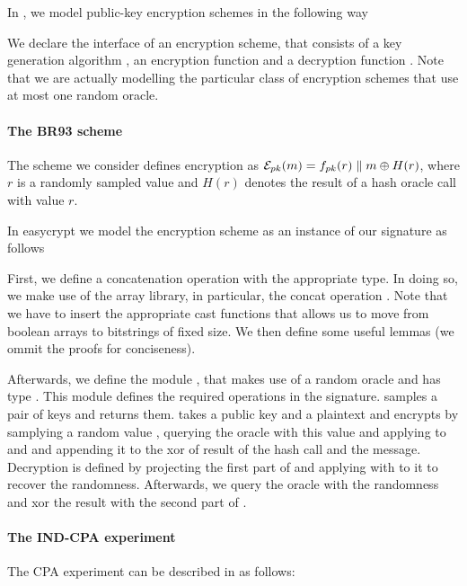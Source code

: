 In \EC, we model public-key encryption schemes in the following way


We declare the interface of an encryption scheme, that consists of a
key generation algorithm , an encryption function  and
a decryption function . Note that we are actually modelling
the particular class of encryption schemes that use at most one random
oracle.

\paragraph{The BR93 scheme}
The scheme we consider defines encryption as 
$\mathcal{E}_{pk}(m) = f_{pk}(r) \parallel m \oplus H(r)$, where $r$ is a
randomly sampled value and $H(r)$ denotes the result of a hash oracle
call with value $r$.

 In easycrypt we model the encryption scheme as an instance of our
  signature as follows


First, we define a concatenation operation with the appropriate
type. In doing so, we make use of the array library, in particular,
the concat operation \ec{||}. Note that we have to insert the
appropriate cast functions that allows us to move from boolean arrays
to bitstrings of fixed size. We then define some useful lemmas (we
ommit the proofs for conciseness).

Afterwards, we define the module , that makes use of a random
oracle  and has type . This module defines the
required operations in the  signature.  samples a
pair of keys and returns them.  takes a public key  and
a plaintext  and encrypts by samplying a random value ,
querying the oracle with this value and applying  to  and
 and appending it to the xor of result of the hash call and the
message. Decryption is defined by projecting the first part of 
and applying  with  to it to recover the
randomness. Afterwards, we query the oracle with the randomness and
xor the result with the second part of .

\paragraph{The \textsf{IND-CPA} experiment}
The CPA experiment can be described in \EC as follows:

